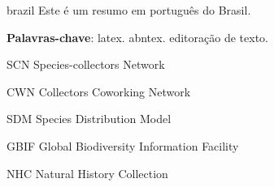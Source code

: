 \documentclass[
	12pt,				%
	openright,			%
	oneside,			%
	a4paper,			%
	sumario=tradicional,%
	french,				%
	spanish,			%
	brazil,				%
    english
	]{abntex2}
\begin{document}
%

\begin{resumo}[Resumo]
 \begin{otherlanguage*}{brazil}
    Este é um resumo em português do Brasil.

   \textbf{Palavras-chave}: latex. abntex. editoração de texto.
 \end{otherlanguage*}
\end{resumo}

%

%

\listoffigures*
\cleardoublepage

\listoftables*
\cleardoublepage

\begin{siglas}
  \item[SCN] Species-collectors Network
  \item[CWN] Collectors Coworking Network
  \item[SDM] Species Distribution Model
  \item[GBIF] Global Biodiversity Information Facility
  \item[NHC] Natural History Collection
  
\end{siglas}
\end{document}
